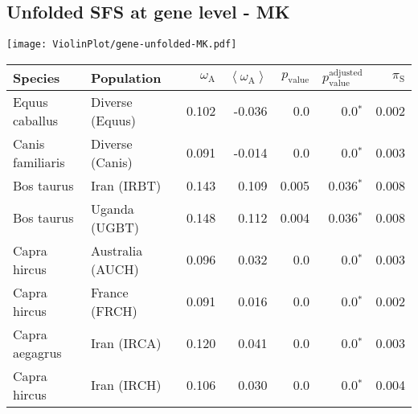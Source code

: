 \subsection{Unfolded SFS at gene level - MK} 
\begin{center}
\texttt{[image: ViolinPlot/gene-unfolded-MK.pdf]} 
\begin{adjustbox}{width = 1\textwidth}
\begin{tabular}{|l|l|r|r|r|r|r|}
\toprule
             Species &                      Population & $\omega_{\mathrm{A}}$ & $\left< \omega_{\mathrm{A}} \right>$ & $p_{\mathrm{value}}$ & $p_{\mathrm{value}}^{\mathrm{adjusted}}$ & $\pi_{\textrm{S}}$ \\
\midrule
      Equus caballus &                 Diverse (Equus) &                 0.102 &                               -0.036 &                  0.0 &                             0.0$\bm{^*}$ &              0.002 \\
    Canis familiaris &                 Diverse (Canis) &                 0.091 &                               -0.014 &                  0.0 &                             0.0$\bm{^*}$ &              0.003 \\
          Bos taurus &                     Iran (IRBT) &                 0.143 &                                0.109 &                0.005 &                           0.036$\bm{^*}$ &              0.008 \\
          Bos taurus &                   Uganda (UGBT) &                 0.148 &                                0.112 &                0.004 &                           0.036$\bm{^*}$ &              0.008 \\
        Capra hircus &                Australia (AUCH) &                 0.096 &                                0.032 &                  0.0 &                             0.0$\bm{^*}$ &              0.003 \\
        Capra hircus &                   France (FRCH) &                 0.091 &                                0.016 &                  0.0 &                             0.0$\bm{^*}$ &              0.002 \\
      Capra aegagrus &                     Iran (IRCA) &                 0.120 &                                0.041 &                  0.0 &                             0.0$\bm{^*}$ &              0.003 \\
        Capra hircus &                     Iran (IRCH) &                 0.106 &                                0.030 &                  0.0 &                             0.0$\bm{^*}$ &              0.004 \\

\end{tabular}
\end{adjustbox}
\end{center}
